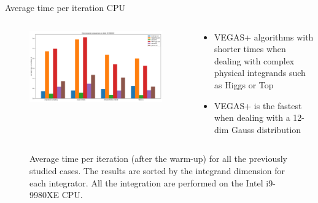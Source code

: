 \documentclass[t,handout,professionalfont,serif]{beamer}
\begin{document}
\begin{frame}{Average time per iteration CPU}
	\tiny
	\begin{columns}
		\begin{column}{0.7 \textwidth}
			\begin{figure}
									\includegraphics[width= \columnwidth]{../tex/images/CPU_final.png}
			\end{figure}

		\end{column}
	\hspace{-0.5cm}
	\begin{column}{0.3\textwidth}
					\vspace{0.7cm}
					
		\begin{itemize}

			\item VEGAS+ algorithms with shorter times when dealing with complex physical integrands such as Higgs or Top
		    \item VEGAS+ is the fastest when dealing with a 12-dim Gauss distribution
	\end{itemize}
	\end{column}
	\end{columns}
	\begin{figure}
		\caption{Average time per iteration (after the warm-up) for all the previously studied cases. The results are sorted by the integrand dimension for each integrator. All the integration are performed on the Intel i9-9980XE CPU. }
	\end{figure}

\end{frame}
\end{document}
